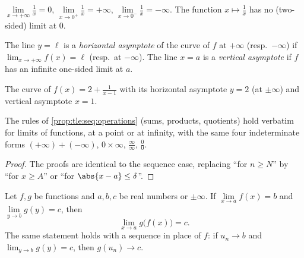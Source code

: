 \begin{example}
$\lim\limits_{x\to+\infty} \frac{1}{x} = 0$,
$\lim\limits_{x\to 0^+} \frac{1}{x} = +\infty$,
$\lim\limits_{x\to 0^-} \frac{1}{x} = -\infty$. The function
$x \mapsto \frac1x$ has no (two-sided) limit at $0$.
\end{example}

\begin{definition}[Asymptotes]\label{def:tle:limcont:asymptote}
The line $y = \ell$ is a \emph{horizontal asymptote} of the
curve of $f$ at $+\infty$ (resp.\ $-\infty$) if
$\lim_{x\to+\infty} f(x) = \ell$ (resp.\ at $-\infty$). The line $x = a$ is a
\emph{vertical asymptote} if $f$ has an infinite one-sided limit at $a$.
\end{definition}

\begin{omfigure}

{\small The curve of $f(x) = 2 + \frac{1}{x-1}$ with its horizontal
asymptote $y = 2$ (at $\pm\infty$) and vertical asymptote $x = 1$.}
\end{omfigure}

\begin{proposition}\label{prop:tle:limcont:operations}
The rules of \cref{prop:tle:seq:operations} (sums, products, quotients) hold
verbatim for limits of functions, at a point or at infinity, with the same
four indeterminate forms $(+\infty)+(-\infty)$, $0\times\infty$,
$\frac{\infty}{\infty}$, $\frac{0}{0}$.
\end{proposition}

\begin{proof}
The proofs are identical to the sequence case, replacing ``for $n \geq N$''
by ``for $x \geq A$'' or ``for $\abs{x-a} \leq \delta$''.
\end{proof}

\begin{theorem}\label{thm:tle:limcont:composition}
Let $f, g$ be functions and $a, b, c$ be real numbers or $\pm\infty$. If
$\lim\limits_{x \to a} f(x) = b$ and $\lim\limits_{y \to b} g(y) = c$, then
\[
\lim_{x \to a} g\bigl(f(x)\bigr) = c .
\]
The same statement holds with a sequence in place of $f$: if
$u_n \to b$ and $\lim_{y\to b} g(y) = c$, then $g(u_n) \to c$.
\end{theorem}

